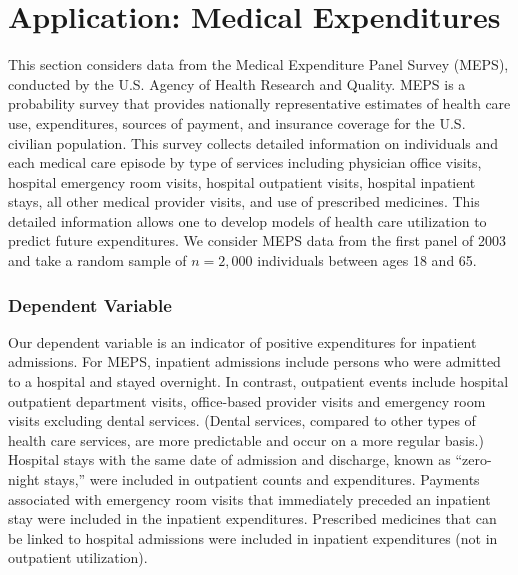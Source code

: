 \section{Application: Medical Expenditures}\label{S11:MEPS}

This section considers data from the Medical Expenditure Panel
Survey (MEPS), conducted by the U.S. Agency of Health Research and
Quality. MEPS is a probability survey that provides nationally
representative estimates of health care use, expenditures, sources
of payment, and insurance coverage for the U.S. civilian population.
This survey collects detailed information on individuals and each
medical care episode by type of services including physician office
visits, hospital emergency room visits, hospital outpatient visits,
hospital inpatient stays, all other medical provider visits, and use
of prescribed medicines. This detailed information allows one to
develop models of health care utilization to predict future
expenditures. We consider MEPS data from the first panel of 2003 and
take a random sample of $n=2,000$ individuals between ages 18 and
65.

\subsubsection*{Dependent Variable}


Our dependent variable is an indicator of positive expenditures for
inpatient admissions. For MEPS, inpatient admissions include persons
who were admitted to a hospital and stayed overnight. In contrast,
outpatient events include hospital outpatient department visits,
office-based provider visits and emergency room visits excluding
dental services. (Dental services, compared to other types of health
care services, are more predictable and occur on a more regular
basis.) Hospital stays with the same date of admission and
discharge, known as ``zero-night stays,'' were included in
outpatient counts and expenditures. Payments associated with
emergency room visits that immediately preceded an inpatient stay
were included in the inpatient expenditures. Prescribed medicines
that can be linked to hospital admissions were included in inpatient
expenditures (not in outpatient utilization).

